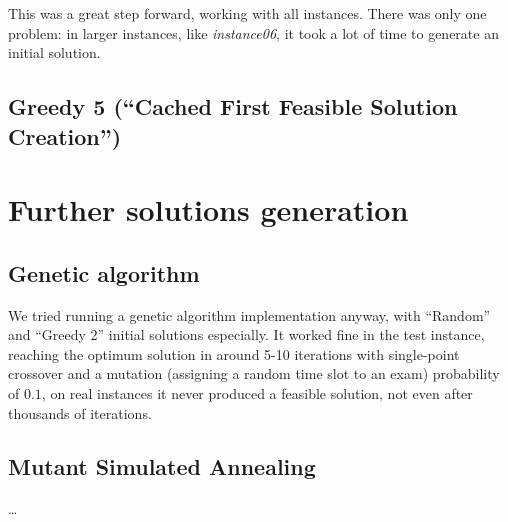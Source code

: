 \documentclass[11pt, a4paper, leqno]{article}
\begin{document}
	 This was a great step forward, working with all instances. There was only one problem: in larger instances, like \textit{instance06}, it took a lot of time to generate an initial solution.
	
	\subsection{Greedy 5 (``Cached First Feasible Solution Creation'')}
	
	
	
	\section{Further solutions generation}
	
	\subsection{Genetic algorithm}
	
	We tried running a genetic algorithm implementation anyway, with ``Random'' and ``Greedy 2'' initial solutions especially. It worked fine in the test instance, reaching the optimum solution in around 5-10 iterations with single-point crossover and a mutation (assigning a random time slot to an exam) probability of $0.1$, on real instances it never produced a feasible solution, not even after thousands of iterations.
	
	\subsection{Mutant Simulated Annealing\texttrademark}
	
	\dots
	
\end{document}
